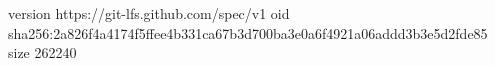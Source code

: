 version https://git-lfs.github.com/spec/v1
oid sha256:2a826f4a4174f5ffee4b331ca67b3d700ba3e0a6f4921a06addd3b3e5d2fde85
size 262240
